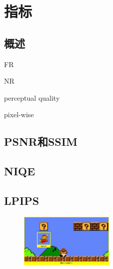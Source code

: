 \documentclass[../main.tex]{subfiles}
\begin{document}
\chapter{指标}

\section{概述}

FR


NR

perceptual quality

pixel-wise

\section{PSNR和SSIM}

\section{NIQE}

\section{LPIPS}


\begin{figure}
\centering
\includegraphics[width=0.4\textwidth]{figures/agentenv.png}
\end{figure}
\end{document}
